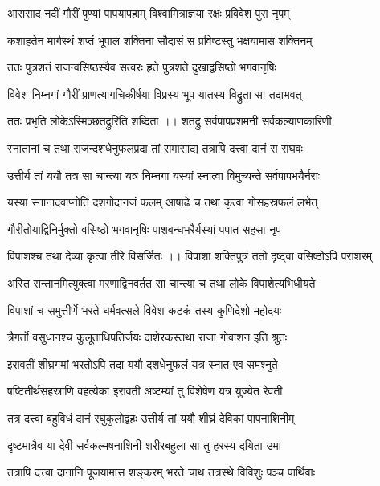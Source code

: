 \twolineshloka
{आससाद नदीं गौरीं पुण्यां पापयापहाम्}
{विश्वामित्राज्ञया रक्षः प्रविवेश पुरा नृपम्} %

\twolineshloka
{कशाहतेन मार्गस्थं शप्तं भूपाल शक्तिना}
{सौदासं स प्रविष्टस्तु भक्षयामास शक्तिनम्}%

\twolineshloka
{ततः पुत्रशतं राजन्वसिष्ठस्यैव सत्वरः}
{हृते पुत्रशते दुखाद्वसिष्ठो भगवानृषिः}%

\twolineshloka
{विवेश निम्नगां गौरीं प्राणत्यागचिकीर्षया}
{विप्रस्य भूप यातस्य विद्रुता सा तदाभवत्}%

\twolineshloka
{ततः प्रभृति लोकेऽस्मिञ्छतद्रुरिति शब्दिता ।। शतद्रु}
{सर्वपापप्रशमनी सर्वकल्याणकारिणी}%

\twolineshloka
{स्नातानां च तथा राजन्दशधेनुफलप्रदा}
{तां समासाद्य तत्रापि दत्त्वा दानं स राघवः}%

\twolineshloka
{उत्तीर्य तां ययौ तत्र सा चान्त्या यत्र निम्नगा}
{यस्यां स्नात्वा विमुच्यन्ते सर्वपापभयैर्नराः}%

\twolineshloka
{यस्यां स्नानादवाप्नोति दशगोदानजं फलम्}
{आषाढे च तथा कृत्वा गोसहस्रफलं लभेत्}%

\twolineshloka
{गौरीतोयाद्विनिर्मुक्तो वसिष्ठो भगवानृषिः}
{पाशबन्धभरैर्यस्यां पपात सहसा नृप}%

\twolineshloka
{विपाशश्च तथा देव्या कृत्वा तीरे विसर्जितः ।। विपाशा}
{शक्तिपुत्रं ततो दृष्ट्वा वसिष्ठोऽपि पराशरम्}%

\twolineshloka
{अस्ति सन्तानमित्युक्त्वा मरणाद्विनवर्तत}
{सा चान्त्या च तथा लोके विपाशेत्यभिधीयते} %

\twolineshloka
{विपाशां च समुत्तीर्णे भरते धर्मवत्सले}
{विवेश कटकं तस्य कुणिदेशो महोदयः}%

\twolineshloka
{त्रैगर्तो वसुधानश्च कुलूताधिपतिर्जयः}
{दाशेरकस्तथा राजा गोवाशन इति श्रुतः}%

\twolineshloka
{इरावतीं शीघ्रगमां भरतोऽपि तदा ययौ}
{दशधेनुफलं यत्र स्नात एव समश्नुते}%

\twolineshloka
{षष्टितीर्थसहस्राणि वहत्येका इरावती}
{अष्टम्यां तु विशेषेण यत्र युज्येत रेवती}%

\twolineshloka
{तत्र दत्त्वा बहुविधं दानं रघुकुलोद्वहः}
{उत्तीर्य तां ययौ शीघ्रं देविकां पापनाशिनीम्}%

\twolineshloka
{दृष्टमात्रैव या देवी सर्वकल्मषनाशिनी}
{शरीरबहुला सा तु हरस्य दयिता उमा}%

\twolineshloka
{तत्रापि दत्त्वा दानानि पूजयामास शङ्करम्}
{भरते चाथ तत्रस्थे विविशुः पञ्च पार्थिवाः}%

